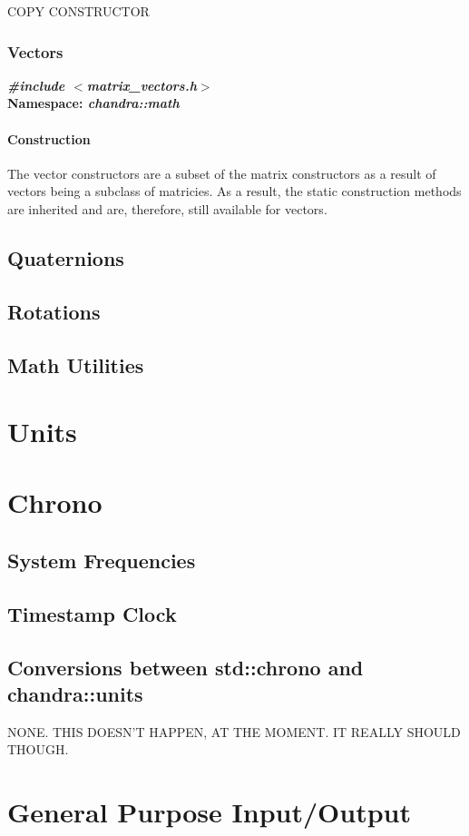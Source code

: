 \documentclass[10pt,letterpaper]{memoir} %
\newcommand{\apiheader}[2]{\noindent{}\textbf{\emph{\#include $<$#1$>$}}\\\noindent{}\textbf{Namespace: \emph{#2}}}
\begin{document}
COPY CONSTRUCTOR

\subsection{Vectors}
\label{sec:math:vectors}
\apiheader{matrix\_vectors.h}{chandra::math}

\subsubsection{Construction}
The vector constructors are a subset of the matrix constructors as a result of vectors being a subclass of matricies.  As a result, the static construction methods are inherited and are, therefore, still available for vectors.

\section{Quaternions}
\section{Rotations}
\section{Math Utilities}

\chapter{Units}

\chapter{Chrono}
\section{System Frequencies}
\section{Timestamp Clock}
\section{Conversions between std::chrono and chandra::units}
NONE.  THIS DOESN'T HAPPEN, AT THE MOMENT.  IT REALLY SHOULD THOUGH.

\chapter{General Purpose Input/Output}
\end{document}

